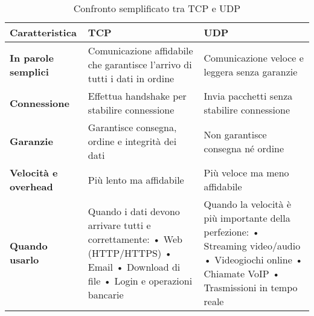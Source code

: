 \begin{table}[htbp]
    \centering
    \begin{tabular}{|p{3.5cm}|p{5.5cm}|p{5.5cm}|}
        \hline
        \rowcolor{bg_custom}
        \textbf{Caratteristica} & \textbf{TCP} & \textbf{UDP} \\
        \hline
        \textbf{In parole semplici} & Comunicazione affidabile che garantisce l'arrivo di tutti i dati in ordine & Comunicazione veloce e leggera senza garanzie \\
        \hline
        \textbf{Connessione} & Effettua handshake per stabilire connessione & Invia pacchetti senza stabilire connessione \\
        \hline
        \textbf{Garanzie} & Garantisce consegna, ordine e integrità dei dati & Non garantisce consegna né ordine \\
        \hline
        \textbf{Velocità e overhead} & Più lento ma affidabile & Più veloce ma meno affidabile \\
        \hline
        \textbf{Quando usarlo} & Quando i dati devono arrivare tutti e correttamente: \newline
        • Web (HTTP/HTTPS) \newline
        • Email \newline
        • Download di file \newline
        • Login e operazioni bancarie & Quando la velocità è più importante della perfezione: \newline
        • Streaming video/audio \newline
        • Videogiochi online \newline
        • Chiamate VoIP \newline
        • Trasmissioni in tempo reale \\
        \hline
    \end{tabular}
    \caption{Confronto semplificato tra TCP e UDP}
    \label{tab:tcp_vs_udp}
\end{table}


